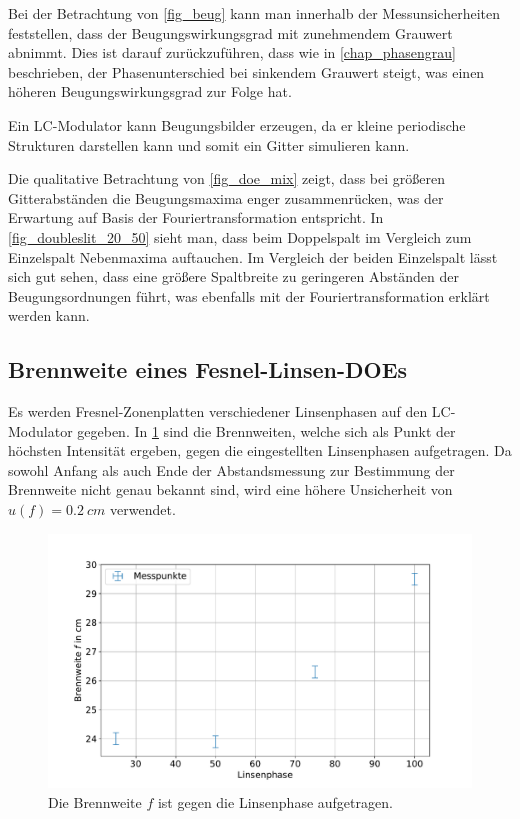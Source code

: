 \documentclass[
	a4paper,
	12pt,
	pagesize,
	ngerman
]{scrartcl}
\begin{document}
			Bei der Betrachtung von \cref{fig_beug} kann man innerhalb der Messunsicherheiten feststellen, dass der Beugungswirkungsgrad mit zunehmendem Grauwert abnimmt.
			Dies ist darauf zurückzuführen, dass wie in \cref{chap_phasengrau} beschrieben, der Phasenunterschied bei sinkendem Grauwert steigt, was einen höheren Beugungswirkungsgrad zur Folge hat.

			Ein LC-Modulator kann Beugungsbilder erzeugen, da er kleine periodische Strukturen darstellen kann und somit ein Gitter simulieren kann. %

			Die qualitative Betrachtung von \cref{fig_doe_mix} zeigt, dass bei größeren Gitterabständen die Beugungsmaxima enger zusammenrücken, was der Erwartung auf Basis der Fouriertransformation entspricht.
			In \cref{fig_doubleslit_20_50} sieht man, dass beim Doppelspalt im Vergleich zum Einzelspalt Nebenmaxima auftauchen.
			Im Vergleich der beiden Einzelspalt lässt sich gut sehen, dass eine größere Spaltbreite zu geringeren Abständen der Beugungsordnungen führt, was ebenfalls mit der Fouriertransformation erklärt werden kann.

		\subsection{Brennweite eines Fesnel-Linsen-DOEs}
		Es werden Fresnel-Zonenplatten verschiedener Linsenphasen auf den LC-Modulator gegeben.
		In \cref{fig_fresnel} sind die Brennweiten, welche sich als Punkt der höchsten Intensität ergeben, gegen die eingestellten Linsenphasen aufgetragen.
		Da sowohl Anfang als auch Ende der Abstandsmessung zur Bestimmung der Brennweite nicht genau bekannt sind, wird eine höhere Unsicherheit von $u(f)=\SI{0.2}{cm}$ verwendet.

\begin{figure}[H] %
			\includegraphics[width=0.8\linewidth]{img/fresnel}
			\caption{
			Die Brennweite $f$ ist gegen die Linsenphase aufgetragen.
			}
			\label{fig_fresnel}
	\end{figure}
\end{document}
